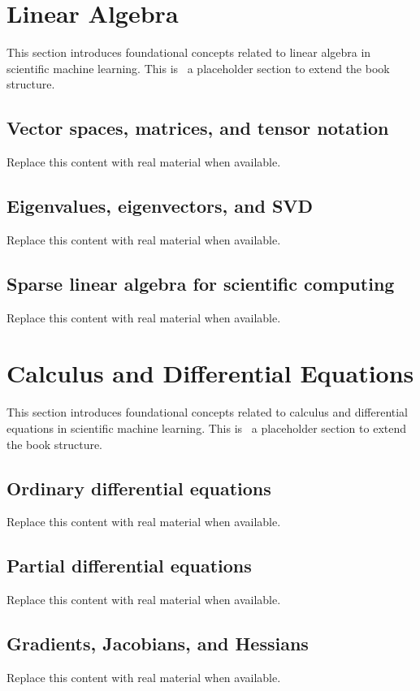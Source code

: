 
\section{Linear Algebra}
This section introduces foundational concepts related to linear algebra in scientific machine learning. This is~\cite{abdulmaksoudTransformerBasedSensorFusion2025} a placeholder section to extend the book structure.

\subsection{Vector spaces, matrices, and tensor notation}
Replace this content with real material when available.

\subsection{Eigenvalues, eigenvectors, and SVD}
Replace this content with real material when available.

\subsection{Sparse linear algebra for scientific computing}
Replace this content with real material when available.

\section{Calculus and Differential Equations}
This section introduces foundational concepts related to calculus and differential equations in scientific machine learning. This is~\cite{abdulmaksoudTransformerBasedSensorFusion2025} a placeholder section to extend the book structure.

\subsection{Ordinary differential equations}
Replace this content with real material when available.

\subsection{Partial differential equations}
Replace this content with real material when available.

\subsection{Gradients, Jacobians, and Hessians}
Replace this content with real material when available.

